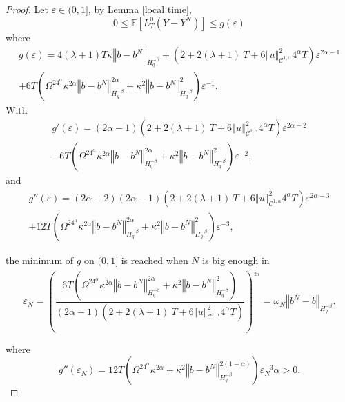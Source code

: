 \documentclass[11pt]{article}
\newcommand{\norme}[1]{\left\Vert #1\right\Vert}
\newcommand{\E}{\mathbb{E}}
\begin{document}
\begin{proof}
    Let $\varepsilon\in(0,1]$, by Lemma \ref{local time},    
    \begin{equation*}
    0\leq\E\left[L^0_T(Y-Y^N)\right]\leq g(\varepsilon)
    \end{equation*}
    where \begin{multline*}
    g(\varepsilon) = 4(\lambda + 1)T\kappa\norme{b-b^N}_{H^{-\beta}_{q}} + \left(2 + 2(\lambda + 1)\ T + 6\norme{u}_{\mathcal{C}^{1,\alpha}}^2 4^{\alpha}T\right) \varepsilon^{2\alpha-1} \\ + 6T\left(\Omega^24^{\alpha}\kappa^{2\alpha} \norme{b-b^N}_{H^{-\beta}_q}^{2\alpha}+\kappa^2\norme{b-b^N}_{H^{-\beta}_{q}}^2\right)\varepsilon^{-1}.
    \end{multline*}    
    With \begin{multline*}
    g'(\varepsilon)=(2\alpha-1)\left(2 + 2(\lambda + 1)\ T + 6\norme{u}_{\mathcal{C}^{1,\alpha}}^2 4^{\alpha}T\right)\varepsilon^{2\alpha-2}\\-6T\left(\Omega^24^{\alpha}\kappa^{2\alpha} \norme{b-b^N}_{H^{-\beta}_q}^{2\alpha}+\kappa^2\norme{b-b^N}_{H^{-\beta}_{q}}^2\right)\varepsilon^{-2},
    \end{multline*}
    and 
    \begin{multline*}
    g''(\varepsilon)=(2\alpha-2)(2\alpha-1)\left(2 + 2(\lambda + 1)\ T + 6\norme{u}_{\mathcal{C}^{1,\alpha}}^2 4^{\alpha}T\right)\varepsilon^{2\alpha-3}\\+12T\left(\Omega^24^{\alpha}\kappa^{2\alpha} \norme{b-b^N}_{H^{-\beta}_q}^{2\alpha}+\kappa^2\norme{b-b^N}_{H^{-\beta}_{q}}^2\right)\varepsilon^{-3},\end{multline*}
    
    the minimum of $g$ on $(0,1]$ is reached when $N$ is big enough in \begin{equation*}
    \varepsilon_N=\left(\frac{6T\left(\Omega^24^{\alpha}\kappa^{2\alpha} \norme{b-b^N}_{H^{-\beta}_q}^{2\alpha}+\kappa^2\norme{b-b^N}_{H^{-\beta}_{q}}^2\right)}{(2\alpha-1)\left(2 + 2(\lambda + 1)\ T + 6\norme{u}_{\mathcal{C}^{1,\alpha}}^2 4^{\alpha}T\right)}\right)^{\frac{1}{2\alpha}}=\omega_N \norme{b^N-b}_{H^{-\beta}_{q}}.
    \end{equation*}
    
    where 
    \begin{equation*}
    g''(\varepsilon_N)
    =12T\left(\Omega^24^{\alpha}\kappa^{2\alpha} +\kappa^2\norme{b-b^N}_{H^{-\beta}_{q}}^{2(1-\alpha)}\right)\varepsilon_N^{-3}\alpha>0.
    \end{equation*}
    

\end{proof}
\end{document}
